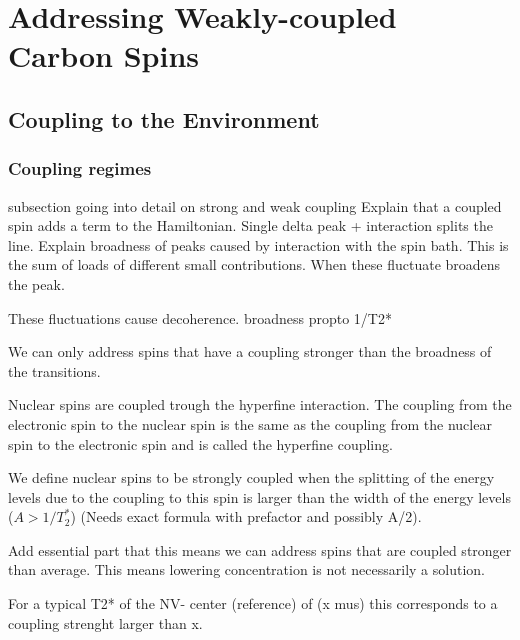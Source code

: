 
\chapter{Addressing Weakly-coupled Carbon Spins}

\section{Coupling to the Environment}

\subsection{Coupling regimes}
subsection going into detail on strong and weak coupling
Explain that a coupled spin adds a term to the Hamiltonian.
Single delta peak
+ interaction splits the line.
Explain broadness of peaks caused by interaction with the spin bath.
This is the sum of loads of different small contributions. When these fluctuate broadens the peak.

These fluctuations cause decoherence. broadness propto 1/T2*

We can only address spins that have a coupling stronger than the broadness of the transitions.

Nuclear spins are coupled trough the hyperfine interaction. The coupling from the electronic spin to the nuclear spin is the same as the coupling from the nuclear spin to the electronic spin and is called the hyperfine coupling.

We define nuclear spins to be strongly coupled when the splitting of the energy levels due to the coupling to this spin is larger than the width of the energy levels ($A> 1/T_2^*$) (Needs exact formula with prefactor and possibly A/2).

Add essential part that this means we can address spins that are coupled stronger than average. This means lowering concentration is not necessarily a solution.

For a typical T2* of the NV- center (reference) of (x mus) this corresponds to a coupling strenght larger than x.

